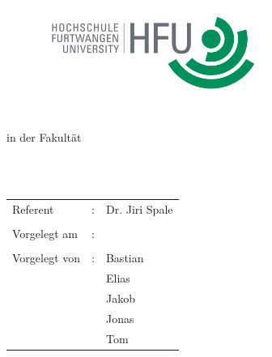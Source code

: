 \begin{titlepage}
\pagestyle{empty}

\begin{flushright}
\begin{figure}[ht]
\flushright
\includegraphics[height=3cm]{pictures/hfu.jpg}
\end{figure}
\end{flushright}

\begin{center}
{\fontsize{18}{22} \selectfont \docArtDerArbeit}\\[5mm]
{\fontsize{18}{22} \selectfont in der Fakult\"at} \\[5mm]
{\fontsize{18}{22} \selectfont \docFakultaet}\\
\vspace{1cm}
\begin{onehalfspace}
{\fontsize{22}{26} \selectfont \textbf{\docTitle}}\\[5mm]
{\fontsize{18}{22} \selectfont \docUntertitle}


\end{onehalfspace}
\end{center}

\vfill
\begin{center}
\begin{tabular}{lcl}
Referent	&:& Dr. Jiri Spale	\\ \\
Vorgelegt am 	&:& \docAbgabedatum 	\\ \\
Vorgelegt von 	&:& Bastian	\\
		& & Elias	\\
		& & Jakob	\\
		& & Jonas	\\
		& & Tom
\end{tabular}
\end{center}
\end{titlepage}
